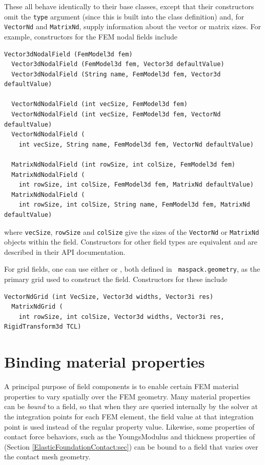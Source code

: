 %
These all behave identically to their base classes,
except that their constructors omit the {\tt type} argument (since
this is built into the class definition) and, for {\tt VectorNd} and
{\tt MatrixNd}, supply information about the vector or matrix sizes.
For example, constructors for the FEM nodal fields include
%
\begin{lstlisting}[]
  Vector3dNodalField (FemModel3d fem)
  Vector3dNodalField (FemModel3d fem, Vector3d defaultValue)
  Vector3dNodalField (String name, FemModel3d fem, Vector3d defaultValue)

  VectorNdNodalField (int vecSize, FemModel3d fem)
  VectorNdNodalField (int vecSize, FemModel3d fem, VectorNd defaultValue)
  VectorNdNodalField (
    int vecSize, String name, FemModel3d fem, VectorNd defaultValue)

  MatrixNdNodalField (int rowSize, int colSize, FemModel3d fem)
  MatrixNdNodalField (
    int rowSize, int colSize, FemModel3d fem, MatrixNd defaultValue)
  MatrixNdNodalField (
    int rowSize, int colSize, String name, FemModel3d fem, MatrixNd defaultValue)
\end{lstlisting}
%
where {\tt vecSize}, {\tt rowSize} and {\tt colSize} give the sizes of
the {\tt VectorNd} or {\tt MatrixNd} objects within the
field. Constructors for other field types are equivalent and are described
in their API documentation.

For grid fields, one can use either
 or
, both defined in {\tt
maspack.geometry}, as the primary grid used to construct the
field. Constructors for these include
%
\begin{lstlisting}[]
  VectorNdGrid (int VecSize, Vector3d widths, Vector3i res)
  MatrixNdGrid (
    int rowSize, int colSize, Vector3d widths, Vector3i res, RigidTransform3d TCL)
\end{lstlisting}
%

\section{Binding material properties}
\label{sec:fieldBinding}

A principal purpose of field components is to enable certain FEM
material properties to vary spatially over the FEM geometry.  Many
material properties can be {\it bound} to a field, so that when they
are queried internally by the solver at the integration points for
each FEM element, the field value at that integration point is used
instead of the regular property value. Likewise, some
properties of contact force behaviors, such as
the {\sf YoungsModulus} and {\sf thickness} properties of
(Section \ref{ElasticFoundationContact:sec}) can be bound to a field
that varies over the contact mesh geometry.

